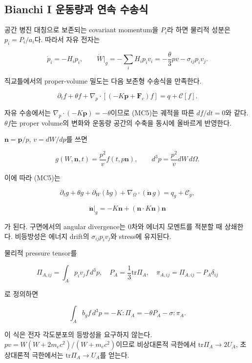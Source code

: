 \hypertarget{bianchi-i-uxc6b4uxb3d9uxb7c9uxacfc-uxc5f0uxc18d-uxc218uxc1a1uxc2dd}{%
\subsection{Bianchi I 운동량과 연속 수송식}\label{bianchi-i-uxc6b4uxb3d9uxb7c9uxacfc-uxc5f0uxc18d-uxc218uxc1a1uxc2dd}}

공간 병진 대칭으로 보존되는 covariant momentum을 \(P_i\)라 하면 물리적 성분은 \(p_i=P_i/a_i\)다. 따라서 자유 전자는

\[
\dot p_i=-H_i p_i,\qquad
\dot W\big|_g=-\sum_iH_ip_iv_i
=-\frac{\theta}{3}p v-\sigma_{ij}p_iv_j.
\tag{MC4}
\]

직교틀에서의 proper-volume 밀도는 다음 보존형 수송식을 만족한다.

\[
\partial_t f+\theta f+
\nabla_p\cdot[(-K\boldsymbol p+\boldsymbol F_c)f]
=q+\mathcal C[f].
\tag{MC5}
\]

자유 수송에서는 \(\nabla_p\cdot(-K\boldsymbol p)=-\theta\)이므로 (MC5)는 궤적을 따른 \(df/dt=0\)와 같다. \(\theta f\)는 proper volume의 변화와 운동량 공간의 수축을 동시에 올바르게 반영한다.

\(\boldsymbol n=\boldsymbol p/p\), \(v=dW/dp\)를 쓰면

\[
g(W,\boldsymbol n,t)=\frac{p^2}{v}f(t,p\boldsymbol n),\qquad
d^3p=\frac{p^2}{v}dW\,d\Omega.
\tag{MC6}
\]

이에 따라 (MC5)는

\[
\partial_tg+\theta g+\partial_W(bg)+
\nabla_{\!\Omega}\cdot(\dot{\boldsymbol n}\,g)
=q_g+\mathcal C_g,
\tag{MC7}
\]

\[
\dot{\boldsymbol n}\big|_g=-K\boldsymbol n+
(\boldsymbol n\cdot K\boldsymbol n)\boldsymbol n
\tag{MC8}
\]

가 된다. 구면에서의 angular divergence는 0차와 에너지 모멘트를 적분할 때 상쇄한다. 비등방성은 에너지 drift의 \(\sigma_{ij}p_iv_j\)와 stress에 유지된다.

물리적 pressure tensor를

\[
\Pi_{A,ij}=\int_Ap_iv_jf\,d^3p,
\quad P_A=\frac13\mathrm{tr}\Pi_A,
\quad\pi_{A,ij}=\Pi_{A,ij}-P_A\delta_{ij}
\tag{MC9}
\]

로 정의하면

\[
\int_A b_g f\,d^3p=-K:\Pi_A=-\theta P_A-\sigma:\pi_A.
\tag{MC10}
\]

이 식은 전자 각도분포의 등방성을 요구하지 않는다. \(pv=W(W+2m_ec^2)/(W+m_ec^2)\)이므로 비상대론적 극한에서 \(\mathrm{tr}\Pi_A\to2U_A\), 초상대론적 극한에서는 \(\mathrm{tr}\Pi_A\to U_A\)를 얻는다.

